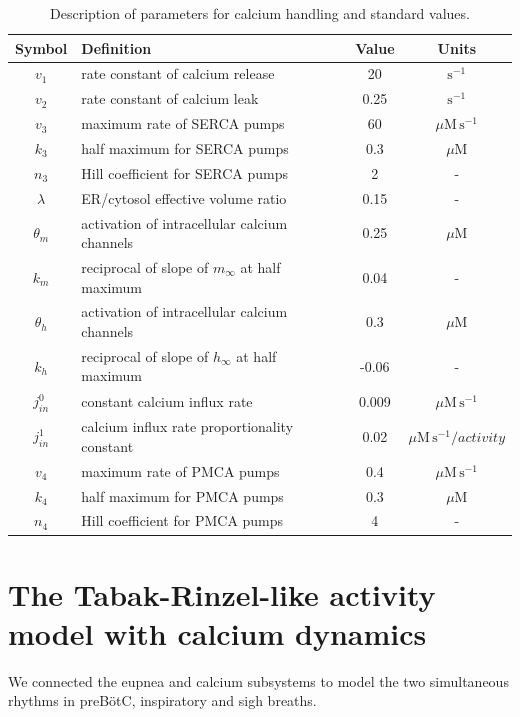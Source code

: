 \documentclass[12pt]{article}
\def\pre{preB\"otC\xspace}
\def\micromolar{\mu\mathrm{M}}
\def\persecond{\mathrm{s}^{-1}}
\def\micromolarpersecond{\mu\mathrm{M}\,\mathrm{s}^{-1}}
\def\jin{j_{in}}
\def\jinzero{\jin^0}
\def\jinone{\jin^1}
\def\minf{m_\infty}
\def\hinf{h_\infty}
\def\thetam{\theta_m}
\def\km{k_m}
\def\thetah{\theta_h}
\def\kh{k_h}
\begin{document}
\begin{table}[h!]
\centering 
\begin{tabular}{clcc}
    Symbol & Definition & Value &Units  \\
\hline 
\hline
$v_1$ & rate constant of calcium release & 20  & $\persecond$  \\
$v_2$ & rate constant of calcium leak   & 0.25 & $\persecond$ \\
$v_3$ & maximum rate of SERCA pumps & 60  &  $\micromolarpersecond$  \\
$k_3$ & half maximum for SERCA pumps  & 0.3 & $\micromolar$ \\
$n_3$ & Hill coefficient for SERCA pumps   & 2 & - \\
$\lambda$ & ER/cytosol effective volume ratio & 0.15 & - \\
$\thetam$ & activation of intracellular calcium channels & 0.25 & $\micromolar$ \\
$\km$ & reciprocal of slope of   $\minf$ at half maximum & 0.04 & - \\
$\thetah$ & activation of intracellular calcium channels & 0.3 & $\micromolar$\\
$\kh$ & reciprocal of slope of   $\hinf$ at half maximum & -0.06 & - \\
    \hline 
 $\jinzero$ & constant calcium influx rate  & 0.009 & $\micromolarpersecond$ \\
  $\jinone$ &  calcium influx rate  proportionality constant & 0.02 & $\micromolarpersecond/activity$ \\
  $v_4$ & maximum rate of PMCA pumps & 0.4  & $\micromolarpersecond$ \\
$k_4$ & half maximum for PMCA pumps  & 0.3 & $\micromolar$ \\
$n_4$ & Hill coefficient for PMCA pumps   & 4 & - \\

    \hline
\end{tabular}
\caption{Description of parameters for calcium handling and standard values.}
\label{ParamDefCalcium}
\end{table}

\clearpage
\section*{The Tabak-Rinzel-like activity model with calcium dynamics}

We connected the eupnea and calcium subsystems to model the two simultaneous rhythms in \pre, inspiratory and sigh breaths. 
\end{document}
